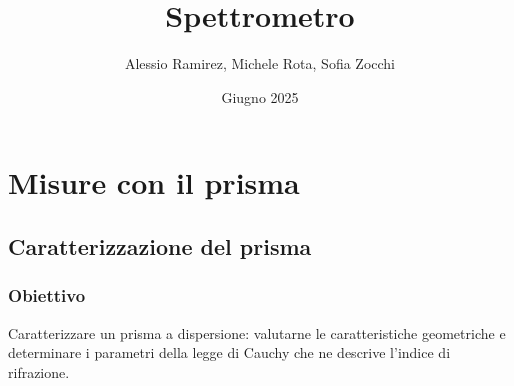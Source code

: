 \documentclass[a4paper]{article}
\title{Spettrometro}
\author{Alessio Ramirez, Michele Rota, Sofia Zocchi}
\date{Giugno 2025}
\begin{document}
\maketitle
\tableofcontents
\newpage

\section{Misure con il prisma}
\subsection{Caratterizzazione del prisma}
\subsubsection{Obiettivo}
Caratterizzare un prisma a dispersione: valutarne le caratteristiche geometriche e determinare i parametri della legge di Cauchy che ne descrive l'indice di rifrazione.
\end{document}
